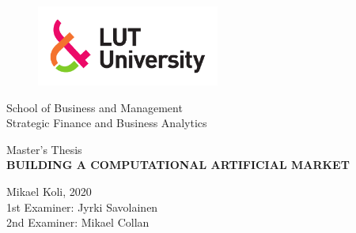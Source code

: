 \thispagestyle{empty} 
\begin{figure}
    \includegraphics[width=60mm]{./figs/LUT-LOGO-CMYK-PDF}
\end{figure}

\begin{flushleft}
    School of Business and Management\\
    Strategic Finance and Business Analytics
\end{flushleft}

\vspace{55mm}

\begin{center}
    \Large
    \sffamily 
    Master's Thesis\\
    \textbf{\MakeUppercase{Building a Computational Artificial Market}}\\
\end{center}

\vspace*{\fill}

\begin{flushright}
    Mikael Koli, 2020\\
    1st Examiner: Jyrki Savolainen\\
    2nd Examiner: Mikael Collan
\end{flushright}

\restoregeometry